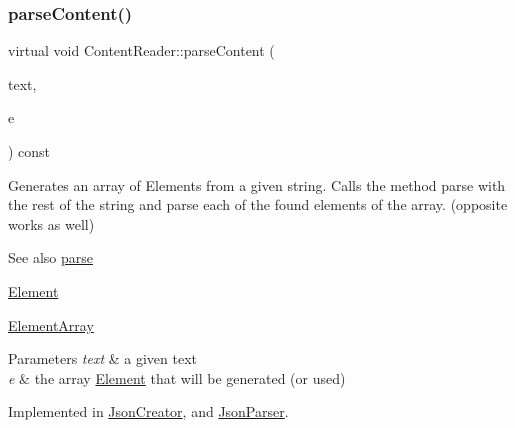 \mbox{\label{classContentReader_a91fdd738983dcc7a246c3c163007dfa9}} 
\subsubsection{\texorpdfstring{parse\+Content()}{parseContent()}\hspace{0.1cm}{\footnotesize\ttfamily [4/6]}}
{\footnotesize\ttfamily virtual void Content\+Reader\+::parse\+Content (\begin{DoxyParamCaption}\item[{std\+::string \&}]{text,  }\item[{\mbox{\hyperlink{classElementArray}{Element\+Array}} $\ast$}]{e }\end{DoxyParamCaption}) const\hspace{0.3cm}{\ttfamily [pure virtual]}}

Generates an array of Elements from a given string. Calls the method parse with the rest of the string and parse each of the found elements of the array. (opposite works as well) \begin{DoxySeeAlso}{See also}
\mbox{\hyperlink{classContentReader_a7fff2e63a2e8fa216665604f69974e1d}{parse}} 

\mbox{\hyperlink{classElement}{Element}} 

\mbox{\hyperlink{classElementArray}{Element\+Array}}
\end{DoxySeeAlso}

\begin{DoxyParams}{Parameters}
{\em text} & a given text \\
\hline
{\em e} & the array \mbox{\hyperlink{classElement}{Element}} that will be generated (or used) \\
\hline
\end{DoxyParams}


Implemented in \mbox{\hyperlink{classJsonCreator_a694669d359eb73890a9e9f247c4ebab4}{Json\+Creator}}, and \mbox{\hyperlink{classJsonParser_aa728c443b247b83cdf6cedb406d8940d}{Json\+Parser}}.

\mbox{\label{classContentReader_a59a8de2bf3436e46b4d029a9b3c3c9da}} 
